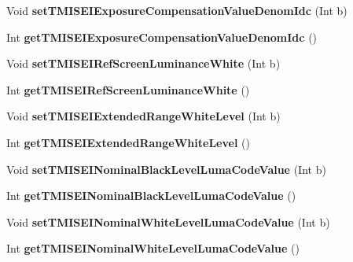 \begin{DoxyCompactItemize}
\mbox{\label{class_t_enc_cfg_a9432e4571e065aa8b468dc7fe722e287}} 
Void {\bfseries set\+T\+M\+I\+S\+E\+I\+Exposure\+Compensation\+Value\+Denom\+Idc} (Int b)
\item 
\mbox{\label{class_t_enc_cfg_a1b09817196700a61ab1ad35608a1c843}} 
Int {\bfseries get\+T\+M\+I\+S\+E\+I\+Exposure\+Compensation\+Value\+Denom\+Idc} ()
\item 
\mbox{\label{class_t_enc_cfg_a0a8a81764b94a9392ccc02257bd800da}} 
Void {\bfseries set\+T\+M\+I\+S\+E\+I\+Ref\+Screen\+Luminance\+White} (Int b)
\item 
\mbox{\label{class_t_enc_cfg_a0ac3d9147a963009de604be446262ed0}} 
Int {\bfseries get\+T\+M\+I\+S\+E\+I\+Ref\+Screen\+Luminance\+White} ()
\item 
\mbox{\label{class_t_enc_cfg_a0f848a48acff294c97505d6fd7bfead3}} 
Void {\bfseries set\+T\+M\+I\+S\+E\+I\+Extended\+Range\+White\+Level} (Int b)
\item 
\mbox{\label{class_t_enc_cfg_a137114ebf634cf171089908dd0b75906}} 
Int {\bfseries get\+T\+M\+I\+S\+E\+I\+Extended\+Range\+White\+Level} ()
\item 
\mbox{\label{class_t_enc_cfg_aabfb677752bdef280cc48366992dd0ff}} 
Void {\bfseries set\+T\+M\+I\+S\+E\+I\+Nominal\+Black\+Level\+Luma\+Code\+Value} (Int b)
\item 
\mbox{\label{class_t_enc_cfg_a99837b5363d6a3330693b77daff947d3}} 
Int {\bfseries get\+T\+M\+I\+S\+E\+I\+Nominal\+Black\+Level\+Luma\+Code\+Value} ()
\item 
\mbox{\label{class_t_enc_cfg_ab47a4b9faa35b8206b578b306b8b9b4f}} 
Void {\bfseries set\+T\+M\+I\+S\+E\+I\+Nominal\+White\+Level\+Luma\+Code\+Value} (Int b)
\item 
\mbox{\label{class_t_enc_cfg_a4ea5d3636d14460da3783bf49dc63d36}} 
Int {\bfseries get\+T\+M\+I\+S\+E\+I\+Nominal\+White\+Level\+Luma\+Code\+Value} ()
\item 
\mbox{\label{class_t_enc_cfg_a75b3ea817d24ad40d248098d12623b08}} 

\end{DoxyCompactItemize}
